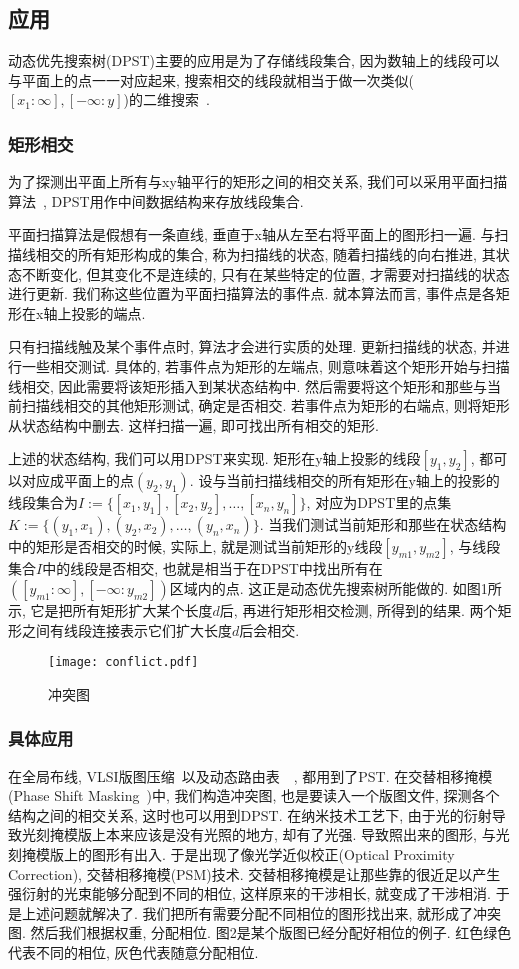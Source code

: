 \documentclass[a4paper]{article}
\begin{document}
\subsection{应用}
动态优先搜索树(DPST)主要的应用是为了存储线段集合, 因为数轴上的线段可以与平面上的点一一对应起来, 搜索相交的线段就相当于做一次类似($[x_1:\infty],[-\infty:y]$)的二维搜索~\cite{GG}. 
\subsubsection{矩形相交}
为了探测出平面上所有与xy轴平行的矩形之间的相交关系, 我们可以采用平面扫描算法~\cite{CG_02}, DPST用作中间数据结构来存放线段集合. 

    平面扫描算法是假想有一条直线, 垂直于x轴从左至右将平面上的图形扫一遍. 与扫描线相交的所有矩形构成的集合, 称为扫描线的状态, 随着扫描线的向右推进, 其状态不断变化, 但其变化不是连续的, 只有在某些特定的位置, 才需要对扫描线的状态进行更新. 我们称这些位置为平面扫描算法的事件点. 就本算法而言, 事件点是各矩形在x轴上投影的端点. 

    只有扫描线触及某个事件点时, 算法才会进行实质的处理. 更新扫描线的状态, 并进行一些相交测试. 具体的, 若事件点为矩形的左端点, 则意味着这个矩形开始与扫描线相交, 因此需要将该矩形插入到某状态结构中. 然后需要将这个矩形和那些与当前扫描线相交的其他矩形测试, 确定是否相交. 若事件点为矩形的右端点, 则将矩形从状态结构中删去. 这样扫描一遍, 即可找出所有相交的矩形. 

    上述的状态结构, 我们可以用DPST来实现. 矩形在y轴上投影的线段$[y_1, y_2]$, 都可以对应成平面上的点$(y_2, y_1)$. 设与当前扫描线相交的所有矩形在y轴上的投影的线段集合为$I:=\{[x_1,y_1],[x_2,y_2],\ldots,[x_n,y_n]\}$, 对应为DPST里的点集
$K:=\{(y_1, x_1),(y_2, x_2),\ldots,(y_n, x_n)\}$.
当我们测试当前矩形和那些在状态结构中的矩形是否相交的时候, 实际上, 就是测试当前矩形的y线段$[y_{m1}, y_{m2}]$, 与线段集合$I$中的线段是否相交, 也就是相当于在DPST中找出所有在$([y_{m1}:\infty],[-\infty:y_{m2}])$区域内的点. 这正是动态优先搜索树所能做的. 如图1所示, 它是把所有矩形扩大某个长度$d$后, 再进行矩形相交检测, 所得到的结果. 两个矩形之间有线段连接表示它们扩大长度$d$后会相交.
\begin{figure}[!h]
  \centering
  \texttt{[image: conflict.pdf]}\\
  \caption{冲突图}\label{fig:conflict}
\end{figure}

\subsubsection{具体应用}
    在全局布线, VLSI版图压缩~\cite{DAC_05}以及动态路由表~\cite{xx_05}~\cite{ISCC_05}, 都用到了PST. 在交替相移掩模(Phase Shift Masking~\cite{PSM_05})中, 我们构造冲突图, 也是要读入一个版图文件, 探测各个结构之间的相交关系, 这时也可以用到DPST. 在纳米技术工艺下, 由于光的衍射导致光刻掩模版上本来应该是没有光照的地方, 却有了光强. 导致照出来的图形, 与光刻掩模版上的图形有出入. 于是出现了像光学近似校正(Optical Proximity Correction), 交替相移掩模(PSM)技术. 交替相移掩模是让那些靠的很近足以产生强衍射的光束能够分配到不同的相位, 这样原来的干涉相长, 就变成了干涉相消. 于是上述问题就解决了. 我们把所有需要分配不同相位的图形找出来, 就形成了冲突图. 然后我们根据权重, 分配相位. 图2是某个版图已经分配好相位的例子. 红色绿色代表不同的相位, 灰色代表随意分配相位.
\end{document}
